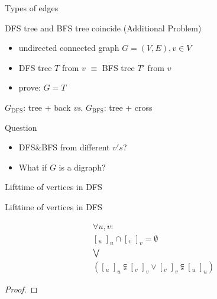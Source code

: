 \begin{frame}{Types of edges}
  \begin{exampleblock}{DFS tree and BFS tree coincide (Additional Problem)}
    \begin{itemize}
	  \item undirected connected graph $G = (V,E), v \in V$ 
	  \item DFS tree $T$ from $v$ $\equiv$ BFS tree $T'$ from $v$
      \item prove: $G = T$
    \end{itemize}
  \end{exampleblock}

  \pause
  \begin{center}
	$G_{\text{DFS}}$: tree + back \emph{vs.} $G_{\text{BFS}}$: tree + cross
  \end{center}

  \pause
  \begin{alertblock}{Question}
	\begin{itemize}
	  \item DFS\&BFS from different $v's$?
	  \item What if $G$ is a digraph?
	\end{itemize}
  \end{alertblock}
\end{frame}
\begin{frame}{Lifttime of vertices in DFS}
\end{frame}
\begin{frame}{Lifttime of vertices in DFS}
  \begin{theorem}
	\begin{gather*}
	  \forall u,v: \\
	  [_{u} \; ]_{u} \cap [_{v} \; ]_{v} = \emptyset \\
	  \bigvee \\
	  ([_{u} \; ]_{u} \subsetneqq [_{v} \; ]_{v} \lor [_{v} \; ]_{v} \subsetneqq [_{u} \; ]_{u})
	\end{gather*}
  \end{theorem}

  \pause

  \begin{proof}
  \end{proof}
\end{frame}
